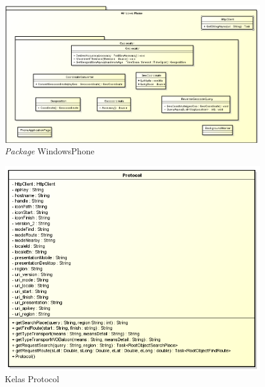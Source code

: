 \begin{figure}[h!]
	\centering
		\includegraphics[scale=0.6]{Gambar/useCase_dan_Class/perClass/packageWindowsPhone}
	\caption{\textit{Package} WindowsPhone}
	\label{fig:kelaslPackageWindowsPhone}
\end{figure}

\newpage

\begin{figure}[h!]
	\centering
		\includegraphics[scale=0.6]{Gambar/useCase_dan_Class/perClass/protocol}
	\caption{Kelas Protocol}
	\label{fig:kelaslProtocol}
\end{figure}

